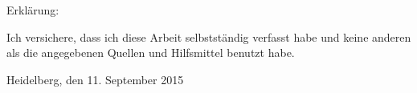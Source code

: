 \cleardoublepage
\setlength{\parindent}{0em}
\thispagestyle{empty}
Erkl\"{a}rung:\par
\vspace{3\baselineskip}
Ich versichere, dass ich diese Arbeit selbstst\"{a}ndig verfasst habe und keine
anderen als die angegebenen Quellen und Hilfsmittel benutzt habe.\par
\vspace{5\baselineskip}
Heidelberg, den 11. September 2015\hspace{3cm}\dotfill

